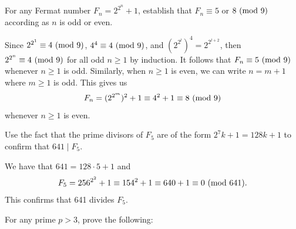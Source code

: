 \begin{exercise}
    For any Fermat number $F_n = 2^{2^n} + 1$, establish that $F_n \equiv 5$ or $8 \ (\mathrm{mod}\ 9)$ according as $n$ is odd or even.  \\
\end{exercise}

\begin{solution}
    Since $2^{2^1} \equiv 4 \ (\mathrm{mod}\ 9)$, $4^4 \equiv 4 \ (\mathrm{mod}\ 9)$, and $(2^{2^l})^4 = 2^{2^{l+2}}$, then $2^{2^n} \equiv 4 \ (\mathrm{mod}\ 9)$ for all odd $n \geq 1$ by induction. It follows that $F_n \equiv 5 \ (\mathrm{mod}\ 9)$ whenever $n \geq 1$ is odd. Similarly, when $n \geq 1$ is even, we can write $n = m+1$ where $m \geq 1$ is odd. This gives us
    $$F_n = (2^{2^{m}})^2 + 1 \equiv 4^2 + 1 \equiv 8 \ (\mathrm{mod}\ 9)$$
    whenever $n \geq 1$ is even. \\
\end{solution}

\begin{exercise}
    Use the fact that the prime divisors of $F_5$ are of the form $2^7k + 1 = 128k + 1$ to confirm that $641 \mid F_5$. \\
\end{exercise}

\begin{solution}
    We have that $641 = 128\cdot 5 + 1$ and 
    $$F_5 = 256^{2^2} + 1 \equiv 154^2 + 1 \equiv 640 + 1 \equiv 0 \ (\mathrm{mod}\ 641).$$
    This confirms that 641 divides $F_5$. \\
\end{solution}

\begin{exercise}
    For any prime $p > 3$, prove the following:
\end{exercise}

